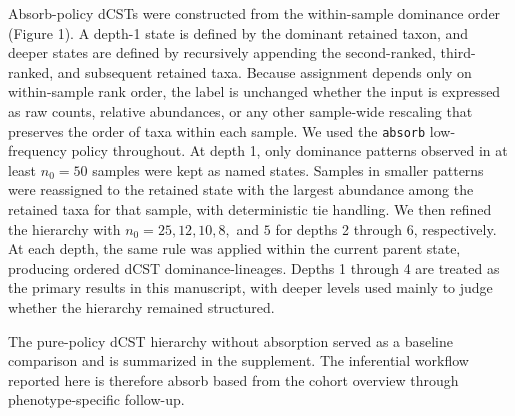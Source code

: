 \documentclass[
  11pt,
]{article}
\begin{document}
Absorb-policy dCSTs were constructed from the within-sample dominance
order (Figure 1). A depth-1 state is defined by the dominant retained
taxon, and deeper states are defined by recursively appending the
second-ranked, third-ranked, and subsequent retained taxa. Because
assignment depends only on within-sample rank order, the label is
unchanged whether the input is expressed as raw counts, relative
abundances, or any other sample-wide rescaling that preserves the order
of taxa within each sample. We used the \texttt{absorb} low-frequency
policy throughout. At depth 1, only dominance patterns observed in at
least \(n_0 = 50\) samples were kept as named states. Samples in smaller
patterns were reassigned to the retained state with the largest abundance
among the retained taxa for that sample, with deterministic tie handling.
We then refined the hierarchy with \(n_0 = 25, 12, 10, 8,\) and \(5\)
for depths 2 through 6, respectively. At each depth, the same rule was
applied within the current parent state, producing ordered dCST
dominance-lineages.
Depths 1 through 4 are treated as the primary results in this manuscript,
with deeper levels used mainly to judge whether the hierarchy remained
structured.

The pure-policy dCST hierarchy without absorption served as a baseline
comparison and is summarized in the supplement. The inferential workflow
reported here is therefore absorb based from the cohort overview through
phenotype-specific follow-up.
\end{document}
